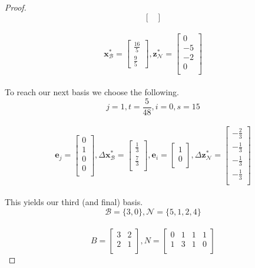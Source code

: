 \documentclass[12pt,oneside]{amsart}
\numberwithin{equation}{section}
\numberwithin{figure}{section}
\theoremstyle{plain}
\theoremstyle{definition}
\begin{document}
\begin{proof}
\[\begin{bmatrix}
\end{bmatrix}\] \\
\[\mathbf{x}^*_{\mathscr{B}} = \begin{bmatrix}
  \frac{16}{5} \\
  \frac{9}{5}
\end{bmatrix},\mathbf{z}^*_{\mathscr{N}} = \begin{bmatrix}
  0  \\
  -5 \\
  -2 \\
  0  \\
\end{bmatrix}\] \\
To reach our next basis we choose the following. \\
\[j=1,t=\frac{5}{48},i=0,s=15\] \\
\[\mathbf{e}_j = \begin{bmatrix}
  0 \\
  1 \\
  0 \\
  0 \\
\end{bmatrix},\Delta\mathbf{x}^*_{\mathscr{B}} = \begin{bmatrix} 
  \frac{1}{3} \\
  \frac{7}{3} \\
\end{bmatrix},\mathbf{e}_i = \begin{bmatrix}
  1 \\
  0 \\
\end{bmatrix},\Delta\mathbf{z}^*_{\mathscr{N}} = \begin{bmatrix}
  -\frac{2}{3} \\
  -\frac{1}{3} \\
  -\frac{1}{3} \\
  -\frac{1}{3} \\
\end{bmatrix}\] \\
This yields our third (and final) basis. \\
\[\mathscr{B} = \{3,0\},\mathscr{N} = \{5,1,2,4\}\] \\
\[B = \begin{bmatrix}
  3 & 2 \\
  2 & 1 \\
\end{bmatrix}, N = \begin{bmatrix}
  0 & 1 & 1 & 1 \\
  1 & 3 & 1 & 0 \\

\end{bmatrix}\]
\end{proof}
\end{document}
